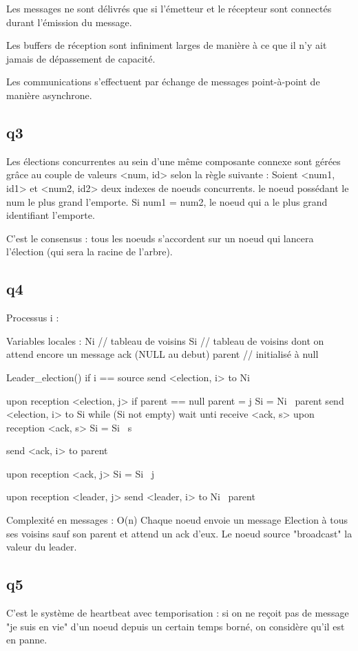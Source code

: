\documentclass[paper=a4, fontsize=11pt]{scrartcl} %
\numberwithin{equation}{section} %
\numberwithin{figure}{section} %
\numberwithin{table}{section} %
\begin{document}
Les messages ne sont délivrés que si l'émetteur et le récepteur sont connectés durant l'émission du message.

Les buffers de réception sont infiniment larges de manière à ce que il n'y ait jamais de dépassement de capacité.

Les communications s'effectuent par échange de messages point-à-point de manière asynchrone.

\subsection{q3}

Les élections concurrentes au sein d'une même composante connexe sont gérées grâce au couple de valeurs <num, id> selon la règle suivante :
Soient <num1, id1> et <num2, id2> deux indexes de noeuds concurrents. le noeud possédant le num le plus grand l'emporte.
Si num1 = num2, le noeud qui a le plus grand identifiant l'emporte.

C'est le consensus : tous les noeuds s'accordent sur un noeud qui lancera l'élection (qui sera la racine de l'arbre).


\subsection{q4}

Processus i :

Variables locales :
Ni // tableau de voisins
Si  // tableau de voisins dont on attend encore un message ack (NULL au debut)
parent // initialisé à null

Leader\_election() {
	if i == source
		send <election, i> to Ni	
}

upon reception <election, j>
	if parent == null
		parent = j
		Si = Ni \ parent
		send <election, i> to Si
		while (Si not empty)
			wait unti receive <ack, s>
			upon reception <ack, s>
			Si = Si \ s

	send <ack, i> to parent
			

upon reception <ack, j>
	Si = Si \ j

upon reception <leader, j>
	send <leader, i> to Ni \ parent


Complexité en messages : O(n)
Chaque noeud envoie un message Election à tous ses voisins sauf son parent et attend un ack d'eux.
Le noeud source "broadcast" la valeur du leader.

 
\subsection{q5}
C'est le système de heartbeat avec temporisation : si on ne reçoit pas de message "je suis en vie" d'un noeud depuis un certain temps borné, on considère qu'il est en panne. 
\end{document}
